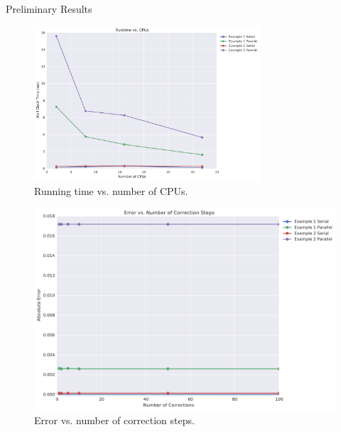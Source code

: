 \documentclass[final]{beamer}
\newlength{\onecolwid}
\begin{document}
\begin{frame}[t]
\begin{columns}[t]
\begin{column}{\onecolwid} %



\begin{block}{Preliminary Results}

\begin{figure}
\includegraphics[width=0.75\textwidth]{../data/runtime_vs_cpus.pdf}
\caption{Running time vs. number of CPUs.}
\label{fig:run_v_cpu}
\end{figure}

\begin{figure}
\includegraphics[width=0.75\linewidth]{../data/error_vs_corrections.pdf}
\caption{Error vs. number of correction steps.}
\label{fig:err_v_k}
\end{figure}


\end{block}
\end{column}
\end{columns}
\end{frame}
\end{document}
